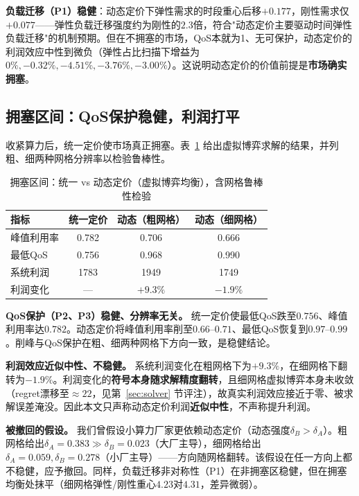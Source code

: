 \documentclass[UTF8,11pt]{ctexart}
\begin{document}
\textbf{负载迁移（P1）稳健}：动态定价下弹性需求的时段重心后移$+0.177$，刚性需求仅$+0.077$——弹性负载迁移强度约为刚性的$2.3$倍，符合"动态定价主要驱动时间弹性负载迁移"的机制预期。但在不拥塞的市场，QoS本就为1、无可保护，动态定价的利润效应中性到微负（弹性占比扫描下增益为$0\%,-0.32\%,-4.51\%,-3.76\%,-3.00\%$）。这说明动态定价的价值前提是\textbf{市场确实拥塞}。

\subsection{拥塞区间：QoS保护稳健，利润打平}

收紧算力后，统一定价使市场真正拥塞。表~\ref{tab:congested} 给出虚拟博弈求解的结果，并列粗、细两种网格分辨率以检验鲁棒性。

\begin{table}[H]
\centering
\caption{拥塞区间：统一 vs 动态定价（虚拟博弈均衡），含网格鲁棒性检验}
\label{tab:congested}
\begin{tabular}{lccc}
\toprule
指标 & 统一定价 & 动态（粗网格） & 动态（细网格） \\
\midrule
峰值利用率 & 0.782 & 0.706 & 0.666 \\
最低QoS & 0.756 & 0.968 & 0.990 \\
系统利润 & 1783 & 1949 & 1749 \\
利润变化 & --- & $+9.3\%$ & $-1.9\%$ \\
\bottomrule
\end{tabular}
\end{table}

\textbf{QoS保护（P2、P3）稳健、分辨率无关。} 统一定价使最低QoS跌至$0.756$、峰值利用率达$0.782$。动态定价将峰值利用率削至$0.66$--$0.71$、最低QoS恢复到$0.97$--$0.99$。削峰与QoS保护在粗、细两种网格下方向一致，是稳健结论。

\textbf{利润效应近似中性、不稳健。} 系统利润变化在粗网格下为$+9.3\%$，在细网格下翻转为$-1.9\%$。利润变化的\textbf{符号本身随求解精度翻转}，且细网格虚拟博弈本身未收敛（regret漂移至$\approx22$，见第~\ref{sec:solver} 节评注），故真实利润效应接近于零、被求解误差淹没。因此本文只声称动态定价利润\textbf{近似中性}，不声称提升利润。

\textbf{被撤回的假设。} 我们曾假设小算力厂家更依赖动态定价（动态强度$\delta_B>\delta_A$）。粗网格给出$\delta_A=0.383\gg\delta_B=0.023$（大厂主导），细网格给出$\delta_A=0.059,\delta_B=0.278$（小厂主导）——方向随网格翻转。该假设在任一方向上都不稳健，应予撤回。同样，负载迁移非对称性（P1）在非拥塞区稳健，但在拥塞均衡处抹平（细网格弹性/刚性重心$4.23$对$4.31$，差异微弱）。
\end{document}

